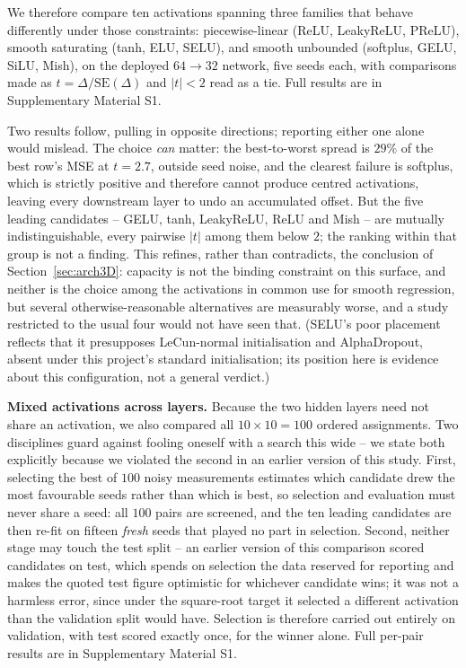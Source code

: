 \documentclass[sn-basic,iicol,pdflatex]{sn-jnl}
\begin{document}
We therefore compare ten activations spanning three families that behave
differently under those constraints: piecewise-linear (ReLU, LeakyReLU, PReLU),
smooth saturating (tanh, ELU, SELU), and smooth unbounded (softplus, GELU,
SiLU, Mish), on the deployed $64\to32$ network, five seeds each, with
comparisons made as $t=\Delta/\mathrm{SE}(\Delta)$ and $|t|<2$ read as a tie.
Full results are in Supplementary Material S1.

Two results follow, pulling in opposite directions; reporting either one
alone would mislead. The choice \emph{can} matter: the best-to-worst spread
is $29\%$ of the best row's MSE at $t=2.7$, outside seed noise, and the
clearest failure is softplus, which is strictly positive and therefore
cannot produce centred activations, leaving every downstream layer to undo
an accumulated offset. But the five leading candidates -- GELU, tanh,
LeakyReLU, ReLU and Mish -- are mutually indistinguishable, every pairwise
$|t|$ among them below $2$; the ranking within that group is not a finding.
This refines, rather than contradicts, the conclusion of
Section~\ref{sec:arch3D}: capacity is not the binding constraint on this
surface, and neither is the choice among the activations in common use for
smooth regression, but several otherwise-reasonable alternatives are
measurably worse, and a study restricted to the usual four would not have
seen that. (SELU's poor placement reflects that it presupposes LeCun-normal
initialisation and AlphaDropout, absent under this project's standard
initialisation; its position here is evidence about this configuration, not
a general verdict.)

\noindent\textbf{Mixed activations across layers.}
Because the two hidden layers need not share an activation, we also compared
all $10\times10=100$ ordered assignments. Two disciplines guard against
fooling oneself with a search this wide -- we state both explicitly because
we violated the second in an earlier version of this study. First, selecting
the best of $100$ noisy measurements estimates which candidate drew the most
favourable seeds rather than which is best, so selection and evaluation must
never share a seed: all $100$ pairs are screened, and the ten leading
candidates are then re-fit on fifteen \emph{fresh} seeds that played no part
in selection. Second, neither stage may touch the test split -- an earlier
version of this comparison scored candidates on test, which spends on
selection the data reserved for reporting and makes the quoted test figure
optimistic for whichever candidate wins; it was not a harmless error, since
under the square-root target it selected a different activation than the
validation split would have. Selection is therefore carried out entirely on
validation, with test scored exactly once, for the winner alone. Full
per-pair results are in Supplementary Material S1.
\end{document}
